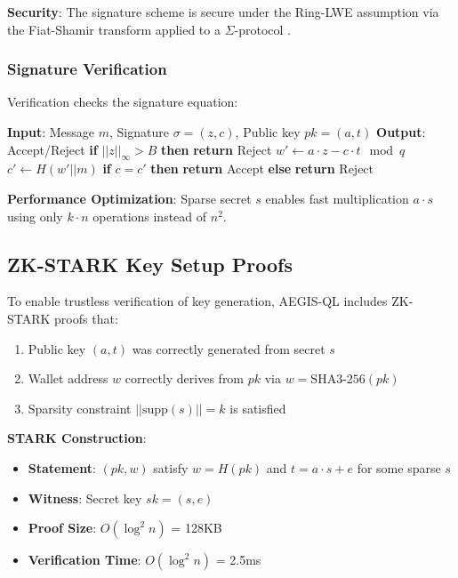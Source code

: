 \documentclass[11pt,a4paper]{article}
\begin{document}
\textbf{Security}: The signature scheme is secure under the Ring-LWE assumption via the Fiat-Shamir transform applied to a $\Sigma$-protocol \cite{lyubashevsky2012}.

\subsubsection{Signature Verification}

Verification checks the signature equation:

\begin{algorithm}[H]
\caption{AEGIS-QL Verification}
\begin{algorithmic}[1]
\State \textbf{Input}: Message $m$, Signature $\sigma = (z, c)$, Public key $pk = (a, t)$
\State \textbf{Output}: Accept/Reject
\State
\State \textbf{if} $||z||_\infty > B$ \textbf{then} \textbf{return} Reject
\State $w' \leftarrow a \cdot z - c \cdot t \mod q$
\State $c' \leftarrow H(w' || m)$
\State \textbf{if} $c = c'$ \textbf{then} \textbf{return} Accept \textbf{else} \textbf{return} Reject
\end{algorithmic}
\end{algorithm}

\textbf{Performance Optimization}: Sparse secret $s$ enables fast multiplication $a \cdot s$ using only $k \cdot n$ operations instead of $n^2$.

\subsection{ZK-STARK Key Setup Proofs}

To enable trustless verification of key generation, AEGIS-QL includes ZK-STARK proofs that:

\begin{enumerate}[leftmargin=*]
    \item Public key $(a, t)$ was correctly generated from secret $s$
    \item Wallet address $w$ correctly derives from $pk$ via $w = \text{SHA3-256}(pk)$
    \item Sparsity constraint $||\text{supp}(s)|| = k$ is satisfied
\end{enumerate}

\textbf{STARK Construction}:
\begin{itemize}
    \item \textbf{Statement}: $(pk, w)$ satisfy $w = H(pk)$ and $t = a \cdot s + e$ for some sparse $s$
    \item \textbf{Witness}: Secret key $sk = (s, e)$
    \item \textbf{Proof Size}: $O(\log^2 n)$ = 128KB
    \item \textbf{Verification Time}: $O(\log^2 n)$ = 2.5ms
\end{itemize}
\end{document}
